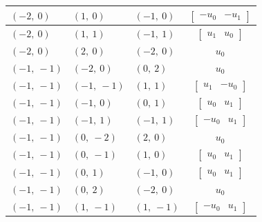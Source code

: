 \documentclass[11pt]{article}
\theoremstyle{definition}
\begin{document}
\begin{longtable}{|l|l|l|c|}
    \hline
    $\left( -2, \  0\right)$ & $\left( 1, \  0\right)$ & $\left( -1, \  0\right)$ & $\left[\begin{matrix}- u_{0} & - u_{1}\end{matrix}\right]$ \\
    \hline
    $\left( -2, \  0\right)$ & $\left( 1, \  1\right)$ & $\left( -1, \  1\right)$ & $\left[\begin{matrix}u_{1} & u_{0}\end{matrix}\right]$ \\
    \hline
    $\left( -2, \  0\right)$ & $\left( 2, \  0\right)$ & $\left( -2, \  0\right)$ & $u_{0}$ \\
    \hline
    $\left( -1, \  -1\right)$ & $\left( -2, \  0\right)$ & $\left( 0, \  2\right)$ & $u_{0}$ \\
    \hline
    $\left( -1, \  -1\right)$ & $\left( -1, \  -1\right)$ & $\left( 1, \  1\right)$ & $\left[\begin{matrix}u_{1} & - u_{0}\end{matrix}\right]$ \\
    \hline
    $\left( -1, \  -1\right)$ & $\left( -1, \  0\right)$ & $\left( 0, \  1\right)$ & $\left[\begin{matrix}u_{0} & u_{1}\end{matrix}\right]$ \\
    \hline
    $\left( -1, \  -1\right)$ & $\left( -1, \  1\right)$ & $\left( -1, \  1\right)$ & $\left[\begin{matrix}- u_{0} & u_{1}\end{matrix}\right]$ \\
    \hline
    $\left( -1, \  -1\right)$ & $\left( 0, \  -2\right)$ & $\left( 2, \  0\right)$ & $u_{0}$ \\
    \hline
    $\left( -1, \  -1\right)$ & $\left( 0, \  -1\right)$ & $\left( 1, \  0\right)$ & $\left[\begin{matrix}u_{0} & u_{1}\end{matrix}\right]$ \\
    \hline
    $\left( -1, \  -1\right)$ & $\left( 0, \  1\right)$ & $\left( -1, \  0\right)$ & $\left[\begin{matrix}u_{0} & u_{1}\end{matrix}\right]$ \\
    \hline
    $\left( -1, \  -1\right)$ & $\left( 0, \  2\right)$ & $\left( -2, \  0\right)$ & $u_{0}$ \\
    \hline
    $\left( -1, \  -1\right)$ & $\left( 1, \  -1\right)$ & $\left( 1, \  -1\right)$ & $\left[\begin{matrix}- u_{0} & u_{1}\end{matrix}\right]$ \\

\end{longtable}
\end{document}
